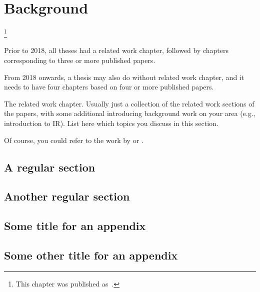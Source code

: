 
\chapter{Background}
\label{chapter:background}

\footnote[]{This chapter was published as~.}
\acresetall

Prior to 2018, all theses had a related work chapter, followed by chapters corresponding to three or more published papers.

From 2018 onwards, a thesis may also do without related work chapter, and it needs to have four chapters based on four or more published papers.  

The related work chapter. Usually just a collection of the related work sections of the papers, with some additional introducing background work on your area (e.g., introduction to IR). List here which topics you discuss in this section.

Of course, you could refer to the work by \citet{meij2010thesis} or \citet{weerkamp2011thesis}.

\section{A regular section}
\lipsum[1]

\section{Another regular section}
\lipsum[2]

\begin{subappendices}
\section{Some title for an appendix}
\lipsum[4]
\section{Some other title for an appendix}
\lipsum[4]
\end{subappendices}

